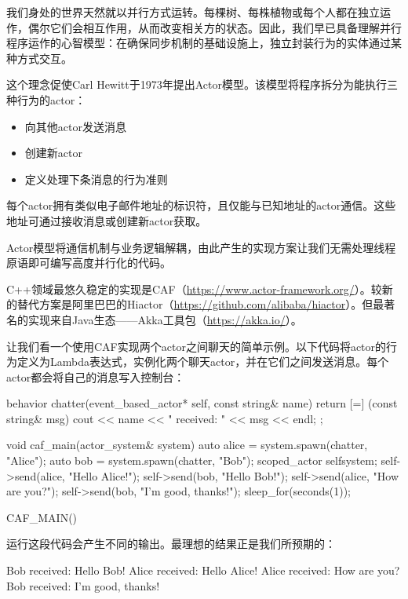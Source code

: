 
我们身处的世界天然就以并行方式运转。每棵树、每株植物或每个人都在独立运作，偶尔它们会相互作用，从而改变相关方的状态。因此，我们早已具备理解并行程序运作的心智模型：在确保同步机制的基础设施上，独立封装行为的实体通过某种方式交互。

这个理念促使Carl Hewitt于1973年提出Actor模型。该模型将程序拆分为能执行三种行为的actor：

\begin{itemize}
\item 
向其他actor发送消息

\item 
创建新actor

\item 
定义处理下条消息的行为准则
\end{itemize}

每个actor拥有类似电子邮件地址的标识符，且仅能与已知地址的actor通信。这些地址可通过接收消息或创建新actor获取。

Actor模型将通信机制与业务逻辑解耦，由此产生的实现方案让我们无需处理线程原语即可编写高度并行化的代码。

C++领域最悠久稳定的实现是CAF（\url{https://www.actor-framework.org/}）。较新的替代方案是阿里巴巴的Hiactor（\url{https://github.com/alibaba/hiactor}）。但最著名的实现来自Java生态——Akka工具包（\url{https://akka.io/}）。

让我们看一个使用CAF实现两个actor之间聊天的简单示例。以下代码将actor的行为定义为Lambda表达式，实例化两个聊天actor，并在它们之间发送消息。每个actor都会将自己的消息写入控制台：

\begin{cpp}
behavior chatter(event_based_actor* self, const string& name) {
  return {
    [=] (const string& msg) {
      cout << name << " received: " << msg << endl;
    }
  };
}

void caf_main(actor_system& system) {
  auto alice = system.spawn(chatter, "Alice");
  auto bob = system.spawn(chatter, "Bob");
  scoped_actor self{system};
  self->send(alice, "Hello Alice!");
  self->send(bob, "Hello Bob!");
  self->send(alice, "How are you?");
  self->send(bob, "I'm good, thanks!");
  sleep_for(seconds(1));
}

CAF_MAIN()
\end{cpp}

运行这段代码会产生不同的输出。最理想的结果正是我们所预期的：

\begin{shell}
Bob received: Hello Bob!
Alice received: Hello Alice!
Alice received: How are you?
Bob received: I'm good, thanks!
\end{shell}

